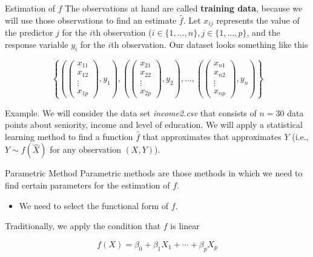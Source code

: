 \documentclass[
  ignorenonframetext,
]{beamer}
\providecommand{\tightlist}{%
  \setlength{\itemsep}{0pt}\setlength{\parskip}{0pt}}\usepackage{longtable,booktabs,array}
\begin{document}
\begin{frame}{Estimation of \(f\)}
\label{estimation-of-f}
The observations at hand are called \textbf{training data}, because we
will use those observations to find an estimate \(\hat{f}\). Let
\(x_{ij}\) represents the value of the predictor \(j\) for the \(i\)th
observation (\(i\in \{1,\ldots,n\}, j\in \{1,\ldots,p\}\), and the
response variable \(y_i\) for the \(i\)th observation. Our dataset looks
something like this

\[
\left\{
\left(
\left( 
\begin{matrix}
x_{11}\\
x_{12}\\
\vdots \\
x_{1p}
\end{matrix}\right),
y_1 \right), 
\left(
\left( 
\begin{matrix}
x_{21}\\
x_{22}\\
\vdots \\
x_{2p}
\end{matrix}\right),
y_2 \right),
\ldots,
\left(
\left( 
\begin{matrix}
x_{n1}\\
x_{n2}\\
\vdots \\
x_{np}
\end{matrix}\right),
y_n
\right)
\right\}
\]

\begin{block}{Example.}
\label{example.}
We will consider the data set \emph{income2.csv} that consists of
\(n=30\) data points about seniority, income and level of education. We
will apply a statistical learning method to find a function \(\hat{f}\)
that approximates that approximates \(Y\) (i.e., \(Y \sim f(\hat{X})\)
for any observation \((X,Y)\)).

\begin{block}{Parametric Method}
\label{parametric-method}
Parametric methods are those methods in which we need to find certain
parameters for the estimation of \(f\).

\begin{itemize}
\tightlist
\item
  We need to select the functional form of \(f\).
\end{itemize}

Traditionally, we apply the condition that \(f\) is linear

\begin{equation}
f(X) = \beta_0+ \beta_1 X_1 + \cdots+ \beta_p X_p
\end{equation}


\end{block}
\end{block}
\end{frame}
\end{document}
